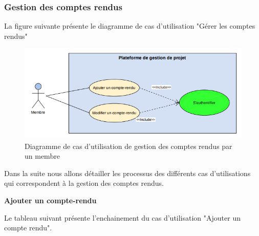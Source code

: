 \subsubsection{		Gestion des comptes rendus}
\hspace{4mm}La figure suivante présente le diagramme de cas d'utilisation "Gérer les comptes rendus"
\begin{figure}[h]
    \centering
    \includegraphics[scale=0.65]{figures/a2.png}
    \caption{Diagramme de cas d'utilisation de gestion des comptes rendus par un membre }
    \label{fig:cas_gerer_cmpterendu}
\end{figure}
\par Dans la suite nous allons détailler les processus des différents cas d'utilisations qui correspondent à la gestion des comptes rendus.
\par \textbf{  	 	 	 	Ajouter un compte-rendu	}
\par Le tableau suivant présente l’enchainement du cas d’utilisation "Ajouter un compte rendu".
